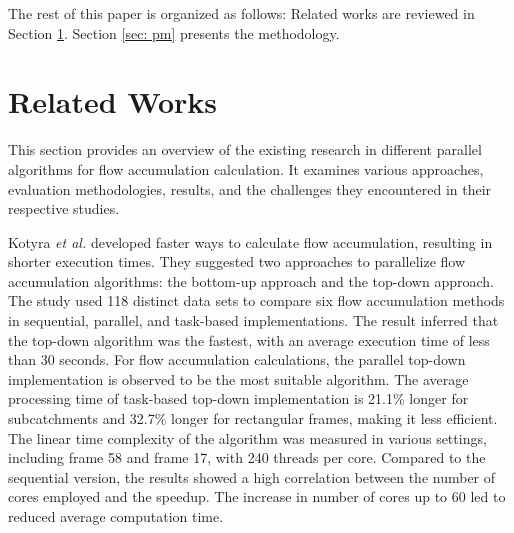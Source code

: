 \documentclass[journal, a4paper]{IEEEtran}
\begin{document}
	 
	

	
	The rest of this paper is organized as follows: Related works are reviewed in Section \ref{sec: ls}.  Section \ref{sec: pm} presents the methodology.
	
	
	
	
	\section{Related Works} 
	\label{sec: ls}
	
	This section provides an overview of the existing research \cite{ KOTYRA2021104741, DEJONG2022105083, CHO2020104774, stojanovic2020accelerating, 10.1007/978-3-030-60939-9_16,KOTYRA2023105613, HUANG2022106} in different parallel algorithms for flow accumulation calculation. It examines various approaches, evaluation methodologies, results, and the challenges they encountered in their respective studies.
	
	Kotyra \textit{et al.} \cite{KOTYRA2021104741} developed faster ways to calculate flow accumulation, resulting in shorter execution times. They suggested two approaches to parallelize flow accumulation algorithms: the bottom-up approach and the top-down approach. The study used 118 distinct data sets to compare six flow accumulation methods in sequential, parallel, and task-based implementations. The result inferred that the top-down algorithm was the fastest, with an average execution time of less than 30 seconds. For flow accumulation calculations, the parallel top-down implementation is observed to be the most suitable algorithm. The average processing time of task-based top-down implementation is 21.1\% longer for subcatchments and 32.7\% longer for rectangular frames, making it less efficient. The linear time complexity of the algorithm was measured in various settings, including frame 58 and frame 17, with 240 threads per core. Compared to the sequential version, the results showed a high correlation between the number of cores employed and the speedup. The increase in number of cores up to 60 led to reduced average computation time.
\end{document}

